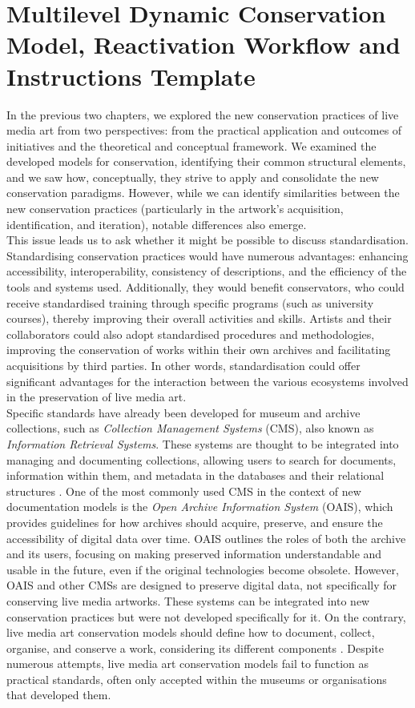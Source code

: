 \chapter{\label{ch:3-mdc_model-reactivation_workflow-instruction_template}Multilevel Dynamic Conservation Model, Reactivation Workflow and Instructions Template}
In the previous two chapters, we explored the new conservation practices of live media art from two perspectives: from the practical application and outcomes of initiatives and the theoretical and conceptual framework. We examined the developed models for conservation, identifying their common structural elements, and we saw how, conceptually, they strive to apply and consolidate the new conservation paradigms. However, while we can identify similarities between the new conservation practices (particularly in the artwork's acquisition, identification, and iteration), notable differences also emerge.\\
This issue leads us to ask whether it might be possible to discuss standardisation. Standardising conservation practices would have numerous advantages: enhancing accessibility, interoperability, consistency of descriptions, and the efficiency of the tools and systems used. Additionally, they would benefit conservators, who could receive standardised training through specific programs (such as university courses), thereby improving their overall activities and skills. Artists and their collaborators could also adopt standardised procedures and methodologies, improving the conservation of works within their own archives and facilitating acquisitions by third parties. In other words, standardisation could offer significant advantages for the interaction between the various ecosystems involved in the preservation of live media art.\\
Specific standards have already been developed for museum and archive collections, such as \textit{Collection Management Systems} (CMS), also known as \textit{Information Retrieval Systems}. These systems are thought to be integrated into managing and documenting collections, allowing users to search for documents, information within them, and metadata in the databases and their relational structures \cite{dekker2018collecting}. One of the most commonly used CMS in the context of new documentation models is the \textit{Open Archive Information System} (OAIS), which provides guidelines for how archives should acquire, preserve, and ensure the accessibility of digital data over time. OAIS outlines the roles of both the archive and its users, focusing on making preserved information understandable and usable in the future, even if the original technologies become obsolete. However, OAIS and other CMSs are designed to preserve digital data, not specifically for conserving live media artworks. These systems can be integrated into new conservation practices but were not developed specifically for it. On the contrary, live media art conservation models should define how to document, collect, organise, and conserve a work, considering its different components \cite{dekker2018collecting}. Despite numerous attempts, live media art conservation models fail to function as practical standards, often only accepted within the museums or organisations that developed them.\\
